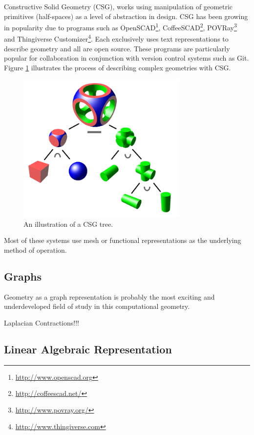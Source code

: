 \documentclass[a4paper]{article}
\begin{document}
Constructive Solid Geometry (CSG), works using manipulation of
geometric primitives (half-spaces) as a level of abstraction in design.
CSG has been growing in popularity due
to programs such as OpenSCAD\footnote{\url{http://www.openscad.org}},
CoffeeSCAD\footnote{\url{http://coffeescad.net/}},
POVRay\footnote{\url{http://www.povray.org/}}
and Thingiverse Customizer\footnote{\url{http://www.thingiverse.com}}.
Each exclusively uses text representations to describe geometry and all
are open source.
These programs are particularly popular for collaboration
in conjunction with version control systems such as Git.
Figure \ref{fig:csgtree} illustrates the process of describing complex
geometries with CSG.

\begin{figure}[h!]
  \centering
    \includegraphics[width=0.75\textwidth]{img/csg_tree.png}
  \caption{An illustration of a CSG tree.}
  \label{fig:csgtree}
\end{figure}

Most of these systems use mesh or functional representations as the
underlying method of operation.

\subsection{Graphs}

Geometry as a graph representation is probably the most exciting and
underdeveloped field of study in this computational geometry. 

Laplacian Contractions!!!
\cite{Cao_Tagliasacchi_Olson_Zhang_Su_2010}

\subsection{Linear Algebraic Representation}
\cite{DiCarlo_Paoluzzi_Shapiro_2014}
\end{document}
